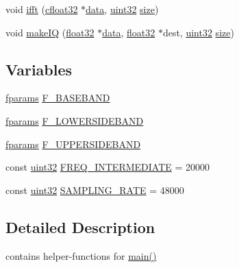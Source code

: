 \begin{DoxyCompactItemize}
void \hyperlink{namespaceradio_a51add4e2faf6d58cabc3b4a3892420eb}{ifft} (\hyperlink{definitions_8hpp_a960be6b6614c08090c16574dba10a421}{cfloat32} $\ast$\hyperlink{Subcarrier_8hpp_a7e2e55177abd6522b546b51f851e8f22}{data}, \hyperlink{definitions_8hpp_a1134b580f8da4de94ca6b1de4d37975e}{uint32} \hyperlink{Subcarrier_8hpp_a0d40f1591c12f359c3fa3f982f9a221d}{size})
\item 
void \hyperlink{namespaceradio_a7166522e76ff88e8d482491b1b6e2275}{make\+I\+Q} (\hyperlink{definitions_8hpp_aacdc525d6f7bddb3ae95d5c311bd06a1}{float32} $\ast$\hyperlink{Subcarrier_8hpp_a7e2e55177abd6522b546b51f851e8f22}{data}, \hyperlink{definitions_8hpp_aacdc525d6f7bddb3ae95d5c311bd06a1}{float32} $\ast$dest, \hyperlink{definitions_8hpp_a1134b580f8da4de94ca6b1de4d37975e}{uint32} \hyperlink{Subcarrier_8hpp_a0d40f1591c12f359c3fa3f982f9a221d}{size})
\end{DoxyCompactItemize}
\subsection*{Variables}
\begin{DoxyCompactItemize}
\item 
\hyperlink{definitions_8hpp_af19387f95516e2132a08cf60503f22a5}{fparams} \hyperlink{namespaceradio_a9bd902e9216499953a5906de73dc1796}{F\+\_\+\+B\+A\+S\+E\+B\+A\+N\+D}
\item 
\hyperlink{definitions_8hpp_af19387f95516e2132a08cf60503f22a5}{fparams} \hyperlink{namespaceradio_a0ffd57d5a11ff70a1f55dbdc8ebe098d}{F\+\_\+\+L\+O\+W\+E\+R\+S\+I\+D\+E\+B\+A\+N\+D}
\item 
\hyperlink{definitions_8hpp_af19387f95516e2132a08cf60503f22a5}{fparams} \hyperlink{namespaceradio_a0ec4548711b6d6ed6867c70b3fc2a413}{F\+\_\+\+U\+P\+P\+E\+R\+S\+I\+D\+E\+B\+A\+N\+D}
\item 
const \hyperlink{definitions_8hpp_a1134b580f8da4de94ca6b1de4d37975e}{uint32} \hyperlink{namespaceradio_aa82ddc6ba206798fd70ffc25665b3cb6}{F\+R\+E\+Q\+\_\+\+I\+N\+T\+E\+R\+M\+E\+D\+I\+A\+T\+E} = 20000
\item 
const \hyperlink{definitions_8hpp_a1134b580f8da4de94ca6b1de4d37975e}{uint32} \hyperlink{namespaceradio_a284213fea4beed2f74bb936927cbe654}{S\+A\+M\+P\+L\+I\+N\+G\+\_\+\+R\+A\+T\+E} = 48000
\end{DoxyCompactItemize}


\subsection{Detailed Description}
contains helper-\/functions for \hyperlink{alsa__test_8cpp_ae66f6b31b5ad750f1fe042a706a4e3d4}{main()} 


